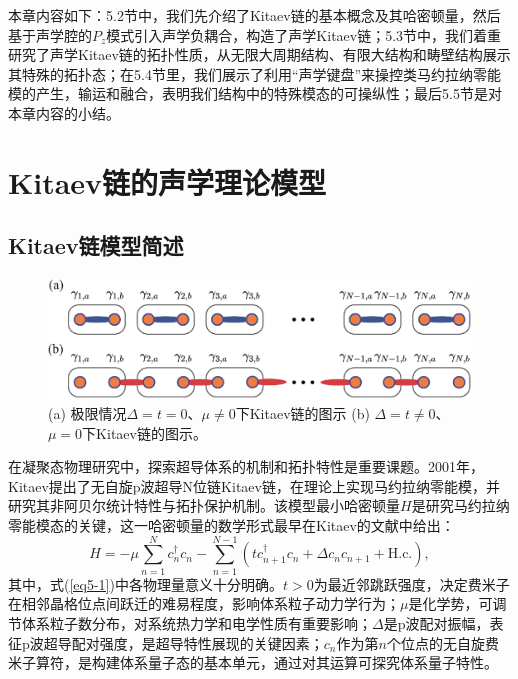 本章内容如下：5.2节中，我们先介绍了Kitaev链的基本概念及其哈密顿量，然后基于声学腔的$P_z$模式引入声学负耦合，构造了声学Kitaev链；5.3节中，我们着重研究了声学Kitaev链的拓扑性质，从无限大周期结构、有限大结构和畴壁结构展示其特殊的拓扑态；在5.4节里，我们展示了利用“声学键盘”来操控类马约拉纳零能模的产生，输运和融合，表明我们结构中的特殊模态的可操纵性；最后5.5节是对本章内容的小结。

\section{Kitaev链的声学理论模型}

\subsection{Kitaev链模型简述}

\begin{figure}[h!]
    \centering
    \includegraphics[width=1\textwidth]{images/fig5-1.eps} 
    \caption{(a) 极限情况$\Delta = t = 0$、$\mu \neq 0$下Kitaev链的图示 (b) $\Delta = t \neq 0$、$\mu = 0$下Kitaev链的图示。}
    \label{fig_5_1}
\end{figure}

在凝聚态物理研究中，探索超导体系的机制和拓扑特性是重要课题。2001年，Kitaev提出了无自旋p波超导N位链Kitaev链，在理论上实现马约拉纳零能模，并研究其非阿贝尔统计特性与拓扑保护机制\cite{C54}。该模型最小哈密顿量$H$是研究马约拉纳零能模态的关键，这一哈密顿量的数学形式最早在Kitaev的文献中给出\cite{C54}：
\begin{equation}\label{eq5-1}
    H = -\mu \sum_{n = 1}^{N} c_{n}^{\dagger} c_{n} - \sum_{n = 1}^{N - 1} (t c_{n + 1}^{\dagger} c_{n} + \Delta c_{n} c_{n + 1} + \text{H.c.}),
\end{equation}
其中，式(\ref{eq5-1})中各物理量意义十分明确。$t > 0$为最近邻跳跃强度，决定费米子在相邻晶格位点间跃迁的难易程度，影响体系粒子动力学行为；$\mu$是化学势，可调节体系粒子数分布，对系统热力学和电学性质有重要影响；$\Delta$是p波配对振幅，表征p波超导配对强度，是超导特性展现的关键因素；$c_{n}$作为第$n$个位点的无自旋费米子算符，是构建体系量子态的基本单元，通过对其运算可探究体系量子特性。

